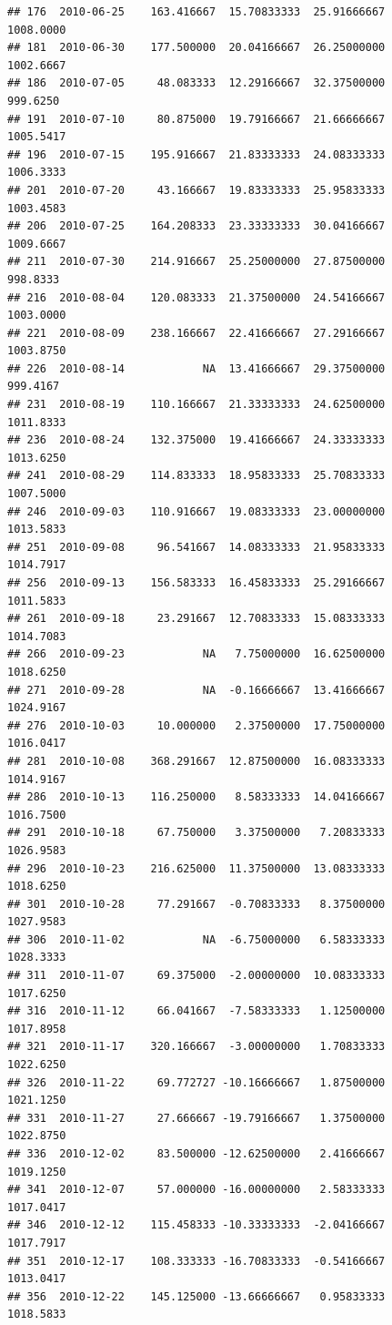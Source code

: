 \documentclass[
]{article}
\begin{document}
\begin{verbatim}
## 176  2010-06-25    163.416667  15.70833333  25.91666667    1008.0000
## 181  2010-06-30    177.500000  20.04166667  26.25000000    1002.6667
## 186  2010-07-05     48.083333  12.29166667  32.37500000     999.6250
## 191  2010-07-10     80.875000  19.79166667  21.66666667    1005.5417
## 196  2010-07-15    195.916667  21.83333333  24.08333333    1006.3333
## 201  2010-07-20     43.166667  19.83333333  25.95833333    1003.4583
## 206  2010-07-25    164.208333  23.33333333  30.04166667    1009.6667
## 211  2010-07-30    214.916667  25.25000000  27.87500000     998.8333
## 216  2010-08-04    120.083333  21.37500000  24.54166667    1003.0000
## 221  2010-08-09    238.166667  22.41666667  27.29166667    1003.8750
## 226  2010-08-14            NA  13.41666667  29.37500000     999.4167
## 231  2010-08-19    110.166667  21.33333333  24.62500000    1011.8333
## 236  2010-08-24    132.375000  19.41666667  24.33333333    1013.6250
## 241  2010-08-29    114.833333  18.95833333  25.70833333    1007.5000
## 246  2010-09-03    110.916667  19.08333333  23.00000000    1013.5833
## 251  2010-09-08     96.541667  14.08333333  21.95833333    1014.7917
## 256  2010-09-13    156.583333  16.45833333  25.29166667    1011.5833
## 261  2010-09-18     23.291667  12.70833333  15.08333333    1014.7083
## 266  2010-09-23            NA   7.75000000  16.62500000    1018.6250
## 271  2010-09-28            NA  -0.16666667  13.41666667    1024.9167
## 276  2010-10-03     10.000000   2.37500000  17.75000000    1016.0417
## 281  2010-10-08    368.291667  12.87500000  16.08333333    1014.9167
## 286  2010-10-13    116.250000   8.58333333  14.04166667    1016.7500
## 291  2010-10-18     67.750000   3.37500000   7.20833333    1026.9583
## 296  2010-10-23    216.625000  11.37500000  13.08333333    1018.6250
## 301  2010-10-28     77.291667  -0.70833333   8.37500000    1027.9583
## 306  2010-11-02            NA  -6.75000000   6.58333333    1028.3333
## 311  2010-11-07     69.375000  -2.00000000  10.08333333    1017.6250
## 316  2010-11-12     66.041667  -7.58333333   1.12500000    1017.8958
## 321  2010-11-17    320.166667  -3.00000000   1.70833333    1022.6250
## 326  2010-11-22     69.772727 -10.16666667   1.87500000    1021.1250
## 331  2010-11-27     27.666667 -19.79166667   1.37500000    1022.8750
## 336  2010-12-02     83.500000 -12.62500000   2.41666667    1019.1250
## 341  2010-12-07     57.000000 -16.00000000   2.58333333    1017.0417
## 346  2010-12-12    115.458333 -10.33333333  -2.04166667    1017.7917
## 351  2010-12-17    108.333333 -16.70833333  -0.54166667    1013.0417
## 356  2010-12-22    145.125000 -13.66666667   0.95833333    1018.5833

\end{verbatim}
\end{document}
